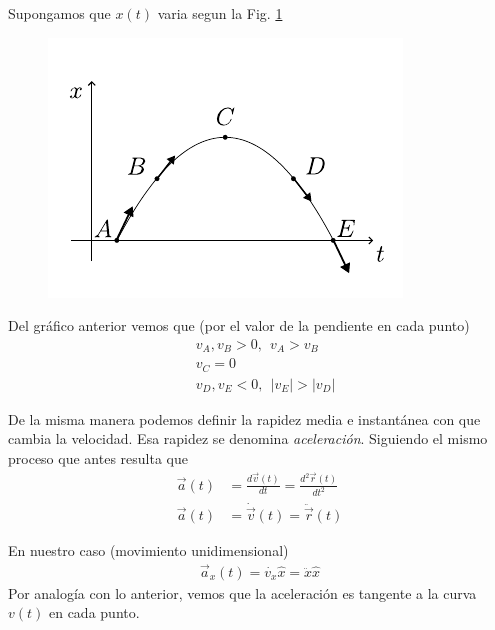 \begin{example}
  Supongamos que $x(t)$ varia segun la Fig. \ref{fig:1-8}

  \begin{figure}[H]
    \centering
    \includegraphics[]{images/f1-8.pdf}
    \caption{}
    \label{fig:1-8}
  \end{figure}
  
  Del gráfico anterior vemos que (por el valor de la pendiente en cada punto)
  \begin{align*}
    &v_{A},v_{B}>0, \ \ v_{A}>v_{B}\\
    &v_{C}=0 \\
    &v_{D},v_{E}<0, \ \ \left|v_{E}\right|>\left|v_{D}\right|    
  \end{align*}
\end{example}

De la misma manera podemos definir la rapidez media e instantánea con que cambia la velocidad. Esa rapidez se 
denomina \textit{aceleración}. Siguiendo el mismo proceso que antes resulta que
\begin{align*}
  \vec{a}(t)&=\frac{d\vec{v}(t)}{dt}=\frac{d^{2}\vec{r}(t)}{dt^{2}}\\
  \vec{a}(t)&=\dot{\vec{v}}(t)=\ddot{\vec{r}}(t)
\end{align*}

En nuestro caso (movimiento unidimensional)
\begin{align*}
  \vec{a}_{x}(t)=\dot{v_{x}}\hat{x}=\ddot{x}\hat{x}
\end{align*}
Por analogía con lo anterior, vemos que la aceleración es tangente a la curva $v(t)$ en cada punto.

